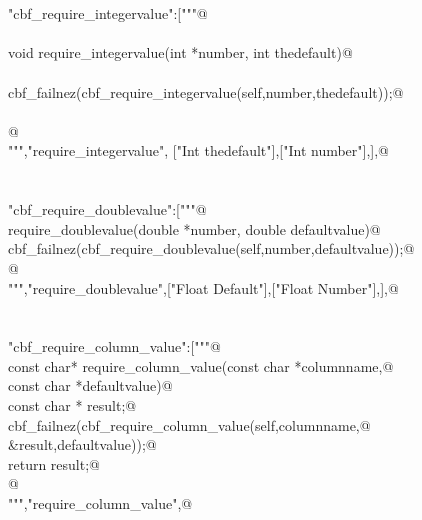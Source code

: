 \documentclass[10pt,a4paper,twoside,notitlepage]{article}
\begin{document}
\begin{flushleft}
\begin{list}{}{}
\mbox{}\verb@@\\
\mbox{}\verb@@\\
\mbox{}\verb@"cbf_require_integervalue":["""@\\
\mbox{}\verb@%apply int *OUTPUT {int *number} require_integervalue;@\\
\mbox{}\verb@@\\
\mbox{}\verb@     void require_integervalue(int *number, int thedefault){@\\
\mbox{}\verb@@\\
\mbox{}\verb@     cbf_failnez(cbf_require_integervalue(self,number,thedefault));@\\
\mbox{}\verb@@\\
\mbox{}\verb@     }@\\
\mbox{}\verb@""","require_integervalue", ["Int thedefault"],["Int number"],],@\\
\mbox{}\verb@@\\
\mbox{}\verb@@\\
\mbox{}\verb@"cbf_require_doublevalue":["""@\\
\mbox{}\verb@%apply double *OUTPUT {double *number} require_doublevalue;@\\
\mbox{}\verb@void require_doublevalue(double *number, double defaultvalue){@\\
\mbox{}\verb@   cbf_failnez(cbf_require_doublevalue(self,number,defaultvalue));@\\
\mbox{}\verb@}@\\
\mbox{}\verb@""","require_doublevalue",["Float Default"],["Float Number"],],@\\
\mbox{}\verb@@\\
\mbox{}\verb@@\\
\mbox{}\verb@"cbf_require_column_value":["""@\\
\mbox{}\verb@ const char* require_column_value(const char *columnname,@\\
\mbox{}\verb@                                  const char *defaultvalue){@\\
\mbox{}\verb@   const char * result;@\\
\mbox{}\verb@   cbf_failnez(cbf_require_column_value(self,columnname,@\\
\mbox{}\verb@                                    &result,defaultvalue));@\\
\mbox{}\verb@   return result;@\\
\mbox{}\verb@}@\\
\mbox{}\verb@""","require_column_value",@\\

\end{list}
\end{flushleft}
\end{document}
